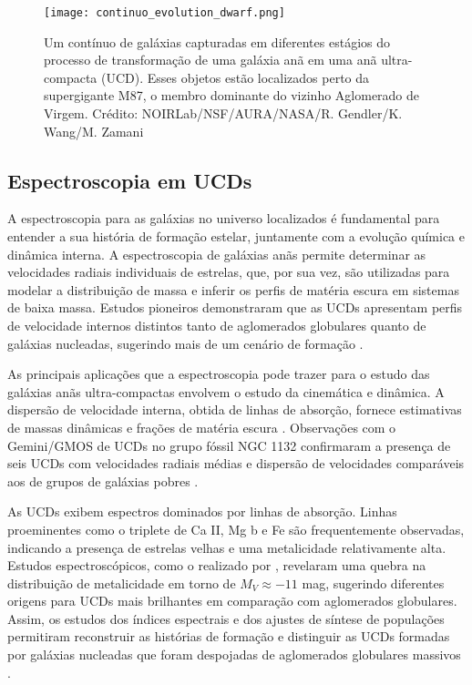 \begin{figure}[!ht]
    \centering
    \texttt{[image: continuo\_evolution\_dwarf.png]} 
    \caption[]{Um contínuo de galáxias capturadas em diferentes estágios do processo de transformação de uma galáxia anã em uma anã ultra-compacta (UCD). Esses objetos estão localizados perto da supergigante M87, o membro dominante do vizinho Aglomerado de Virgem. Crédito: NOIRLab/NSF/AURA/NASA/R. Gendler/K. Wang/M. Zamani}
    \label{continuo_evolution_dwarf}
\end{figure}

\subsection{Espectroscopia em UCDs}\label{subsec:espectroscopia}
A espectroscopia para as galáxias no universo localizados é fundamental para entender a sua história de formação estelar, juntamente com a evolução química e dinâmica interna. A espectroscopia de galáxias anãs permite determinar as velocidades radiais individuais de estrelas, que, por sua vez, são utilizadas para modelar a distribuição de massa e inferir os perfis de matéria escura em sistemas de baixa massa. Estudos pioneiros demonstraram que as UCDs apresentam perfis de velocidade internos distintos tanto de aglomerados globulares quanto de galáxias nucleadas, sugerindo mais de um cenário de formação \citep{Drinkwater_2003, Bekki_2003}. 

As principais aplicações que a espectroscopia pode trazer para o estudo das galáxias anãs ultra-compactas envolvem o estudo da cinemática e dinâmica. A dispersão de velocidade interna, obtida de linhas de absorção, fornece estimativas de massas dinâmicas e frações de matéria escura \citep{Chilingarian_2011}. Observações com o Gemini/GMOS de UCDs no grupo fóssil NGC 1132 confirmaram a presença de seis UCDs com velocidades radiais médias e dispersão de velocidades comparáveis aos de grupos de galáxias pobres \citep{Madrid_2013}.

As UCDs exibem espectros dominados por linhas de absorção. Linhas proeminentes como o triplete de Ca II, Mg b e Fe são frequentemente observadas, indicando a presença de estrelas velhas e uma metalicidade relativamente alta. Estudos espectroscópicos, como o realizado por \cite{Mieske_2006}, revelaram uma quebra na distribuição de metalicidade em torno de $M_V \approx -11$ mag, sugerindo diferentes origens para UCDs mais brilhantes em comparação com aglomerados globulares. Assim, os estudos dos índices espectrais e dos ajustes de síntese de populações permitiram reconstruir as histórias de formação e distinguir as UCDs formadas por galáxias nucleadas que foram despojadas de aglomerados globulares massivos \citep{Mieske_2006}.

